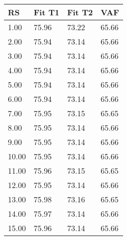 \begin{tabular}{llll}
RS & Fit T1 & Fit T2 & VAF \\ 
\hline 
 1.00 & 75.96 & 73.22 & 65.66 \\ 
 2.00 & 75.94 & 73.14 & 65.66 \\ 
 3.00 & 75.94 & 73.14 & 65.66 \\ 
 4.00 & 75.94 & 73.14 & 65.66 \\ 
 5.00 & 75.94 & 73.14 & 65.66 \\ 
 6.00 & 75.94 & 73.14 & 65.66 \\ 
 7.00 & 75.95 & 73.15 & 65.65 \\ 
 8.00 & 75.95 & 73.14 & 65.66 \\ 
 9.00 & 75.95 & 73.14 & 65.66 \\ 
10.00 & 75.95 & 73.14 & 65.66 \\ 
11.00 & 75.96 & 73.15 & 65.65 \\ 
12.00 & 75.95 & 73.14 & 65.66 \\ 
13.00 & 75.98 & 73.16 & 65.65 \\ 
14.00 & 75.97 & 73.14 & 65.66 \\ 
15.00 & 75.96 & 73.14 & 65.66 \\ 
\hline 
\end{tabular}